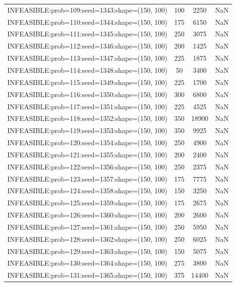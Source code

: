 \begin{longtable}{lccc}
INFEASIBLE:prob=109:seed=1343:shape=(150, 100) &      100 &  2250 &    NaN \\
INFEASIBLE:prob=110:seed=1344:shape=(150, 100) &      175 &  6150 &    NaN \\
INFEASIBLE:prob=111:seed=1345:shape=(150, 100) &      250 &  3075 &    NaN \\
INFEASIBLE:prob=112:seed=1346:shape=(150, 100) &      200 &  1425 &    NaN \\
INFEASIBLE:prob=113:seed=1347:shape=(150, 100) &      225 &  1875 &    NaN \\
INFEASIBLE:prob=114:seed=1348:shape=(150, 100) &       50 &  3400 &    NaN \\
INFEASIBLE:prob=115:seed=1349:shape=(150, 100) &      225 &  1700 &    NaN \\
INFEASIBLE:prob=116:seed=1350:shape=(150, 100) &      300 &  6800 &    NaN \\
INFEASIBLE:prob=117:seed=1351:shape=(150, 100) &      225 &  4525 &    NaN \\
INFEASIBLE:prob=118:seed=1352:shape=(150, 100) &      350 & 18900 &    NaN \\
INFEASIBLE:prob=119:seed=1353:shape=(150, 100) &      350 &  9925 &    NaN \\
INFEASIBLE:prob=120:seed=1354:shape=(150, 100) &      250 &  4900 &    NaN \\
INFEASIBLE:prob=121:seed=1355:shape=(150, 100) &      200 &  2400 &    NaN \\
INFEASIBLE:prob=122:seed=1356:shape=(150, 100) &      250 &  2375 &    NaN \\
INFEASIBLE:prob=123:seed=1357:shape=(150, 100) &      175 &  7775 &    NaN \\
INFEASIBLE:prob=124:seed=1358:shape=(150, 100) &      150 &  3250 &    NaN \\
INFEASIBLE:prob=125:seed=1359:shape=(150, 100) &      175 &  2675 &    NaN \\
INFEASIBLE:prob=126:seed=1360:shape=(150, 100) &      200 &  2600 &    NaN \\
INFEASIBLE:prob=127:seed=1361:shape=(150, 100) &      250 &  5950 &    NaN \\
INFEASIBLE:prob=128:seed=1362:shape=(150, 100) &      250 &  6025 &    NaN \\
INFEASIBLE:prob=129:seed=1363:shape=(150, 100) &      150 &  5075 &    NaN \\
INFEASIBLE:prob=130:seed=1364:shape=(150, 100) &      275 &  3800 &    NaN \\
INFEASIBLE:prob=131:seed=1365:shape=(150, 100) &      375 & 14400 &    NaN \\

\end{longtable}
